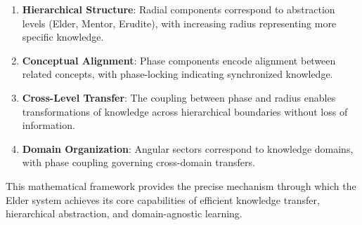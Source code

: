 \begin{enumerate}
    \item \textbf{Hierarchical Structure}: Radial components correspond to abstraction levels (Elder, Mentor, Erudite), with increasing radius representing more specific knowledge.
    
    \item \textbf{Conceptual Alignment}: Phase components encode alignment between related concepts, with phase-locking indicating synchronized knowledge.
    
    \item \textbf{Cross-Level Transfer}: The coupling between phase and radius enables transformations of knowledge across hierarchical boundaries without loss of information.
    
    \item \textbf{Domain Organization}: Angular sectors correspond to knowledge domains, with phase coupling governing cross-domain transfers.
\end{enumerate}

This mathematical framework provides the precise mechanism through which the Elder system achieves its core capabilities of efficient knowledge transfer, hierarchical abstraction, and domain-agnostic learning.